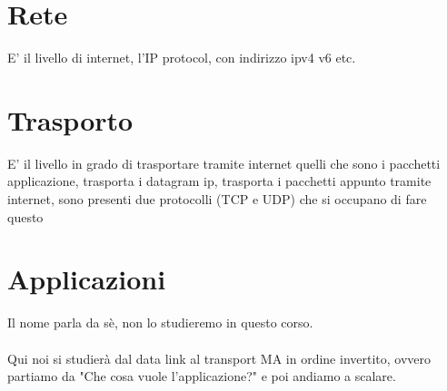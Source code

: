 \documentclass[12pt, a4paper, openany, twoside]{book}
\begin{document}
\section{Rete} E' il livello di internet, l'IP protocol, con indirizzo ipv4 v6 etc.
\section{Trasporto}
E' il livello in grado di trasportare tramite internet quelli che sono i pacchetti
applicazione, trasporta i datagram ip, trasporta i pacchetti appunto tramite 
internet, sono presenti due protocolli (TCP e UDP) che si occupano di fare questo
\section{Applicazioni} Il nome parla da sè, non lo studieremo in questo corso.
\\ \\
Qui noi si studierà dal data link al transport MA in ordine invertito, ovvero
partiamo da "Che cosa vuole l'applicazione?" e poi andiamo a scalare.
\end{document}

